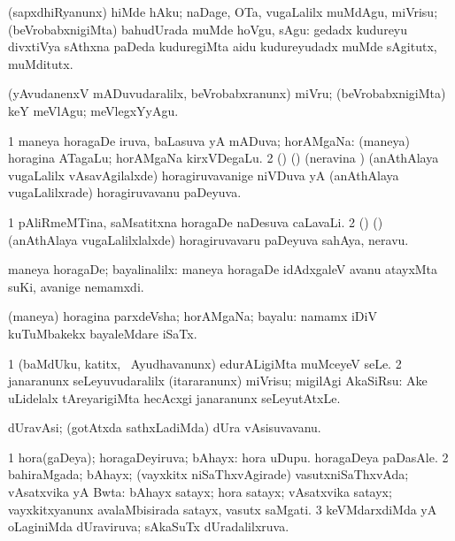 \bentry
{}
\gl{\sakirx}
\bmng
(sapxdhiRyanunx) hiMde hAku; naDage, OTa, \mo vugaLalilx muMdAgu, miVrisu; (beVrobabxnigiMta) bahudUrada muMde hoVgu, sAgu:  gedadx kudureyu divxtiVya sAthxna paDeda kuduregiMta aidu kudureyudadx muMde sAgitutx, muMditutx. 
\emng
\eentry

\bentry
{}
\gl{\sakirx}
\bmng
(yAvudanenxV mADuvudaralilx, beVrobabxranunx) miVru; (beVrobabxnigiMta) keY meVlAgu; meVlegxYyAgu. 
\emng
\eentry

\bentry
{}
\gl{\gu}
\bmng
\bnum
\num{1} maneya horagaDe iruva, baLasuva yA mADuva; horAMgaNa:  (maneya) horagina ATagaLu; horAMgaNa kirxVDegaLu. 
\num{2} (\birx) (\ca) (neravina \vi) (anAthAlaya \mo vugaLalilx vAsavAgilalxde) horagiruvavanige niVDuva yA (anAthAlaya \mo vugaLalilxrade) horagiruvavanu paDeyuva. 
\enum
\emng

\noindent
\gl{\pagu}
\bmng
\bnum
\num{1}  pAliRmeMTina, saMsatitxna horagaDe naDesuva caLavaLi. 
\num{2}  (\birx) (\ca) (anAthAlaya \mo vugaLalilxlalxde) horagiruvavaru paDeyuva sahAya, neravu. 
\enum
\emng
\eentry

\bentry
{}
\gl{\kirxvi}
\bmng
maneya horagaDe; bayalinalilx:  maneya horagaDe idAdxgaleV avanu atayxMta suKi, avanige nemamxdi. 
\emng
\eentry

\bentry
{}
\gl{\nA}
\bmng
(maneya) horagina parxdeVsha; horAMgaNa; bayalu:  namamx iDiV kuTuMbakekx bayaleMdare iSaTx. 
\emng
\eentry

\bentry
{}
\gl{\sakirx}
\bmng
\bnum
\num{1} (baMdUku, katitx, \mo\ Ayudhavanunx) edurALigiMta muMceyeV seLe. 
\num{2} janaranunx seLeyuvudaralilx (itararanunx) miVrisu; migilAgi AkaSiRsu:  Ake uLidelalx tAreyarigiMta hecAcxgi janaranunx seLeyutAtxLe. 
\enum
\emng
\eentry

\bentry
{}
\gl{\nA}
\bmng
dUravAsi; (gotAtxda sathxLadiMda) dUra vAsisuvavanu. 
\emng
\eentry

\bentry
{}
\gl{\gu}
\bmng
\bnum
\num{1} hora(gaDeya); horagaDeyiruva; bAhayx:  hora uDupu.  horagaDeya paDasAle. 
\num{2} bahiraMgada; bAhayx; (vayxkitx niSaThxvAgirade) vasutxniSaThxvAda; vAsatxvika yA Bwta:  bAhayx satayx; hora satayx; vAsatxvika satayx; vayxkitxyanunx avalaMbisirada satayx, vasutx saMgati. 
\num{3} keVMdarxdiMda yA oLaginiMda dUraviruva; sAkaSuTx dUradalilxruva. 
\enum
\emng

